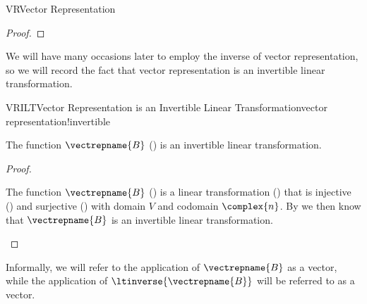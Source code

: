 \begin{subsect}{VR}{Vector Representation}
\begin{proof}
%
\end{proof}
%
\begin{para}We will have many occasions later to employ the inverse of vector representation, so we will record the fact that vector representation is an invertible linear transformation.\end{para}
%
\begin{theorem}{VRILT}{Vector Representation is an Invertible Linear Transformation}{vector representation!invertible}
\begin{para}The function $\vectrepname{B}$ () is an invertible linear transformation.\end{para}
\end{theorem}
%
\begin{proof}
\begin{para}The function $\vectrepname{B}$ () is a linear transformation () that is injective () and surjective () with domain $V$ and codomain $\complex{n}$.  By  we then know that $\vectrepname{B}$ is an invertible linear transformation.\end{para}
%
\end{proof}
%
\begin{para}Informally, we will refer to the application of $\vectrepname{B}$ as  a vector, while the application of $\ltinverse{\vectrepname{B}}$ will be referred to as  a vector.\end{para}
%
%
\end{subsect}
%

